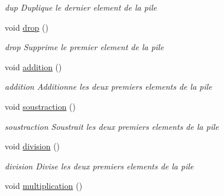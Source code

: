 \begin{DoxyCompactItemize}
\begin{DoxyCompactList}\small\item\em dup Duplique le dernier element de la pile \end{DoxyCompactList}\item 
\hypertarget{class_pile_a7488ed257c6ceb16ed57a9fffb0726d5}{void \hyperlink{class_pile_a7488ed257c6ceb16ed57a9fffb0726d5}{drop} ()}\label{class_pile_a7488ed257c6ceb16ed57a9fffb0726d5}

\begin{DoxyCompactList}\small\item\em drop Supprime le premier element de la pile \end{DoxyCompactList}\item 
\hypertarget{class_pile_a2f7afa189e97a23a836f07f9898538cf}{void \hyperlink{class_pile_a2f7afa189e97a23a836f07f9898538cf}{addition} ()}\label{class_pile_a2f7afa189e97a23a836f07f9898538cf}

\begin{DoxyCompactList}\small\item\em addition Additionne les deux premiers elements de la pile \end{DoxyCompactList}\item 
\hypertarget{class_pile_ab1827b113fff2c3fa59ebbe4c5902b1b}{void \hyperlink{class_pile_ab1827b113fff2c3fa59ebbe4c5902b1b}{soustraction} ()}\label{class_pile_ab1827b113fff2c3fa59ebbe4c5902b1b}

\begin{DoxyCompactList}\small\item\em soustraction Soustrait les deux premiers elements de la pile \end{DoxyCompactList}\item 
\hypertarget{class_pile_a48ef99542609f5033f58ebd23189f698}{void \hyperlink{class_pile_a48ef99542609f5033f58ebd23189f698}{division} ()}\label{class_pile_a48ef99542609f5033f58ebd23189f698}

\begin{DoxyCompactList}\small\item\em division Divise les deux premiers elements de la pile \end{DoxyCompactList}\item 
\hypertarget{class_pile_ae5006ad08419fc6dcf65cbb4970199fe}{void \hyperlink{class_pile_ae5006ad08419fc6dcf65cbb4970199fe}{multiplication} ()}\label{class_pile_ae5006ad08419fc6dcf65cbb4970199fe}


\end{DoxyCompactItemize}
